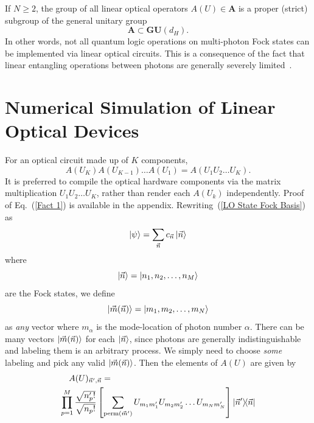 \documentclass[aps,pra,twocolumn,showpacs,superscriptaddress,floatfix,10pt]{revtex4}
\begin{document}
If $N \ge 2$, the group of all linear optical operators $ A(U) \in \textbf{A}$ is a proper (strict) subgroup of the general unitary group
\begin{equation}
\label{Proper Subgroup}
\textbf{A} \subset \textbf{GU}(d_H).
\end{equation}
In other words, not all quantum logic operations on multi-photon Fock states can be implemented via linear optical circuits. This is a consequence of the fact that linear entangling operations between photons are generally severely limited~\cite{Matt Smith,Braunstein,Hong Ou Mandel,Jake Smith}. 
\section{Numerical Simulation of Linear Optical Devices}
\label{Section on Protocol}
For an optical circuit made up of $K$ components,
\begin{equation}
	\label{Fact 1}
A(U_K) A(U_{K-1}) \dots A(U_1) = A(U_1 U_2 \dots U_K).
\end{equation}
It is preferred to compile the optical hardware components via the matrix multiplication $U_1 U_2 \dots U_K$, rather than render each $A(U_k)$ independently. Proof of Eq.~(\ref{Fact 1}) is available in the appendix.
\newline
\newline
\indent Rewriting~(\ref{LO State Fock Basis}) as
\begin{equation}
\label{LO State Fock Vec Basis}
\ket{\psi} = \sum_{\vec{n}} c_{\vec{n}} \ket{\vec{n}}
\end{equation}
where
\begin{equation}
\ket{\vec{n}} = \ket{n_1,n_2,\dots,n_M}
\end{equation}
are the Fock states, we define
\begin{equation}
\label{m definition}
\ket{\vec{m}(\vec{n})} = \ket{m_1,m_2,\dots,m_N}
\end{equation}
as \textit{any} vector where $m_\alpha$ is the mode-location of photon number $\alpha$. There can be many vectors $\ket{\vec{m}(\vec{n})}$ for each $\ket{\vec{n}}$, since photons are generally indistinguishable and labeling them is an arbitrary process. We simply need to choose \textit{some} labeling and pick any valid $\ket{\vec{m}(\vec{n})}$. Then the elements of $A(U)$ are given by
\begin{eqnarray}
\label{Fact 2}
A(U)_{\vec{n}^\prime,\vec{n}} = \quad \quad \quad \quad \quad \quad \quad \quad \quad \quad \quad \quad \quad \quad \quad \quad \quad \\ \small \nonumber \prod_{p=1}^{M} \frac{\sqrt{n_p^\prime !}}{\sqrt{n_p !}} \left[\sum_{\textrm{perm}(\vec{m}^\prime)} U_{m_1 m_1^\prime} U_{m_2 m_2^\prime} \dots U_{m_N m_N^\prime} \right] \outerproduct{\vec{n}^\prime}{\vec{n}} 
\end{eqnarray}
\end{document}
